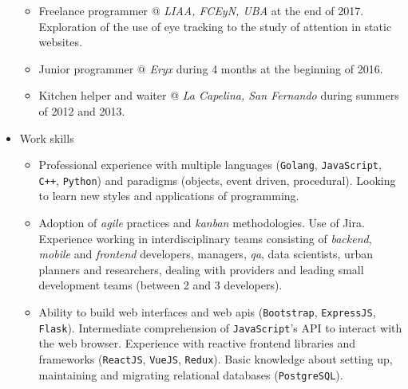 \documentclass[a4paper]{article}
\begin{document}
\begin{itemize}
\begin{itemize}
    \item
      Freelance programmer @ \textit{LIAA, FCEyN, UBA} at the end of 2017.
      \newline
      Exploration of the use of eye tracking to the study of attention in
      static websites.

    \item
      Junior programmer @ \textit{Eryx} during 4 months at the beginning of
      2016.

    \item
      Kitchen helper and waiter @ \textit{La Capelina, San Fernando} during
      summers of 2012 and 2013.

  \end{itemize}

  \item Work skills
  \begin{itemize}

    \item
      Professional experience with multiple languages (\texttt{Golang},
      \texttt{JavaScript}, \texttt{C}\verb|++|, \texttt{Python}) and paradigms
      (objects, event driven, procedural). \newline
      Looking to learn new styles and applications of programming.

    \item
      Adoption of \textit{agile} practices and \textit{kanban} methodologies.
      Use of Jira. \newline
      Experience working in interdisciplinary teams consisting of
      \textit{backend}, \textit{mobile} and \textit{frontend} developers,
      managers, \textit{qa}, data scientists, urban planners and researchers,
      dealing with providers and leading small development teams (between 2 and
      3 developers).

    \item
      Ability to build web interfaces and web apis (\texttt{Bootstrap},
      \texttt{ExpressJS}, \texttt{Flask}). \newline
      Intermediate comprehension of \texttt{JavaScript}'s API to interact with
      the web browser. \newline
      Experience with reactive frontend libraries and frameworks
      (\texttt{ReactJS}, \texttt{VueJS}, \texttt{Redux}). \newline
      Basic knowledge about setting up, maintaining and migrating relational
      databases (\texttt{PostgreSQL}).


\end{itemize}
\end{itemize}
\end{document}
